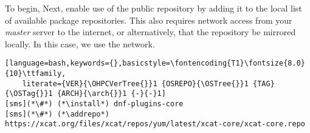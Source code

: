 To begin,
\else
Next,
\fi
enable use of the public \xCAT{} repository by adding it to the local list
of available package repositories. This also requires network access from
your {\em master} server to the internet, or alternatively, that
the repository be mirrored locally. In this case, we use the network.

\begin{lstlisting}[language=bash,keywords={},basicstyle=\fontencoding{T1}\fontsize{8.0}{10}\ttfamily,
	literate={VER}{\OHPCVerTree{}}1 {OSREPO}{\OSTree{}}1 {TAG}{\OSTag{}}1 {ARCH}{\arch{}}1 {-}{-}1]
[sms](*\#*) (*\install*) dnf-plugins-core
[sms](*\#*) (*\addrepo*) https://xcat.org/files/xcat/repos/yum/latest/xcat-core/xcat-core.repo
\end{lstlisting}


